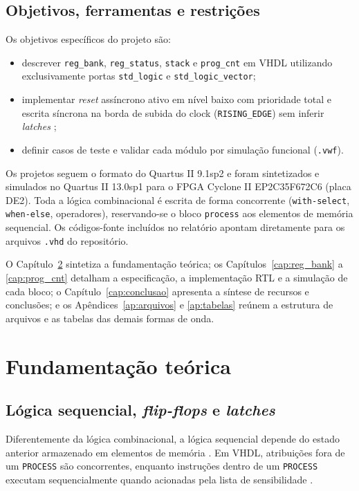 \documentclass[
	12pt,				%
	oneside,			%
	a4paper,			%
	sumario = tradicional,
	english,			%
	brazilian			%
	]{abntex2}
\begin{document}
\section{Objetivos, ferramentas e restrições}

Os objetivos específicos do projeto são:
\begin{itemize}
  \item descrever \texttt{reg\_bank}, \texttt{reg\_status}, \texttt{stack} e \texttt{prog\_cnt} em VHDL utilizando exclusivamente portas \texttt{std\_logic} e \texttt{std\_logic\_vector};
  \item implementar \textit{reset} assíncrono ativo em nível baixo com prioridade total e escrita síncrona na borda de subida do clock (\texttt{RISING\_EDGE}) sem inferir \textit{latches} \cite{aula7,aula8};
  \item definir casos de teste e validar cada módulo por simulação funcional (\texttt{.vwf}).
\end{itemize}

Os projetos seguem o formato do Quartus II 9.1sp2 \cite{tp2} e foram sintetizados e simulados no Quartus II 13.0sp1 para o FPGA Cyclone II EP2C35F672C6 (placa DE2). Toda a lógica combinacional é escrita de forma concorrente (\texttt{with-select}, \texttt{when-else}, operadores), reservando-se o bloco \texttt{process} aos elementos de memória sequencial. Os códigos-fonte incluídos no relatório apontam diretamente para os arquivos \texttt{.vhd} do repositório.

O Capítulo~\ref{cap:fundamentos} sintetiza a fundamentação teórica; os Capítulos~\ref{cap:reg_bank} a \ref{cap:prog_cnt} detalham a especificação, a implementação RTL e a simulação de cada bloco; o Capítulo~\ref{cap:conclusao} apresenta a síntese de recursos e conclusões; e os Apêndices~\ref{ap:arquivos} e \ref{ap:tabelas} reúnem a estrutura de arquivos e as tabelas das demais formas de onda.

\chapter{Fundamentação teórica}
\label{cap:fundamentos}

\section{Lógica sequencial, \textit{flip-flops} e \textit{latches}}

Diferentemente da lógica combinacional, a lógica sequencial depende do estado anterior armazenado em elementos de memória \cite{aula4}. Em VHDL, atribuições fora de um \texttt{PROCESS} são concorrentes, enquanto instruções dentro de um \texttt{PROCESS} executam sequencialmente quando acionadas pela lista de sensibilidade \cite{aula8}.
\end{document}
